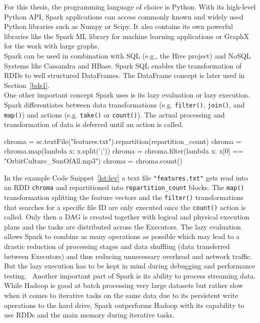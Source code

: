 For this thesis, the programming language of choice is Python. With its high-level Python API, Spark applications can access commonly known and widely used Python libraries such as Numpy or Scipy. It also contains its own powerful libraries like the Spark ML library for machine learning applications or GraphX for the work with large graphs.\\ 
Spark can be used in combination with SQL (e.g., the Hive project) and NoSQL Systems like Cassandra and HBase. Spark SQL enables the transformation of RDDs to well structured DataFrames. The DataFrame concept is later used in Section~\ref{bds1}.\\
One other important concept Spark uses is its lazy evaluation or lazy execution. Spark differentiates between data transformations (e.g. \lstinline{filter()}, \lstinline{join()}, and \lstinline{map()}) and actions (e.g. \lstinline{take()} or \lstinline{count()}). The actual processing and transformation of data is deferred until an action is called. 
\begin{pythonCode}[frame=single,label={lst:lev},caption={Lazy evaluation},captionpos=b]
chroma = sc.textFile("features.txt").repartition(repartition_count)
chroma = chroma.map(lambda x: x.split(';'))
chroma = chroma.filter(lambda x: x[0] == "OrbitCulture_SunOfAll.mp3")
chroma = chroma.count()
\end{pythonCode}
\noindent In the example Code Snippet~\ref{lst:lev} a text file \lstinline{"features.txt"} gets read into an RDD \lstinline{chroma} and repartitioned into \lstinline{repartition_count} blocks. The \lstinline{map()} transformation splitting the feature vectors and the \lstinline{filter()} transformations that searches for a specific file ID are only executed once the \lstinline{count()} action is called. Only then a DAG is created together with logical and physical execution plans and the tasks are distributed across the Executors. The lazy evaluation allows Spark to combine as many operations as possible which may lead to a drastic reduction of processing stages and data shuffling (data transferred between Executors) and thus reducing unnecessary overhead and  network traffic. But the lazy execution has to be kept in mind during debugging and performance testing.~\cite[p.73]{sparkbook1}
\noindent Another important part of Spark is its ability to process streaming data. While Hadoop is good at batch processing very large datasets but rather slow when it comes to iterative tasks on the same data due to its persistent write operations to the hard drive, Spark outperforms Hadoop with its capability to use RDDs and the main memory during iterative tasks. 
